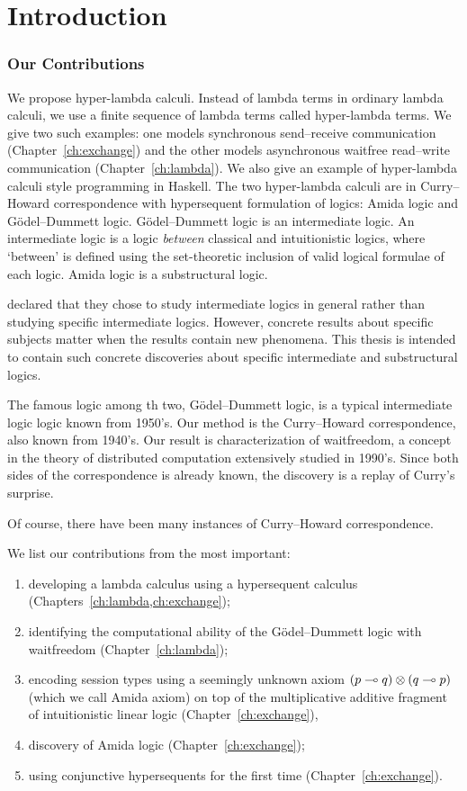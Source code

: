 \chapter{Introduction}

\subsection{Our Contributions}

We propose hyper-lambda calculi.
Instead of lambda terms in ordinary lambda calculi,
we use a finite sequence of lambda terms called hyper-lambda terms.
We give two such examples:
one models synchronous send--receive communication (Chapter~\ref{ch:exchange}) and
the other models asynchronous waitfree
read--write communication (Chapter~\ref{ch:lambda}).
We also give an example of hyper-lambda calculi style programming in Haskell.
The two hyper-lambda calculi are in Curry--Howard correspondence with
hypersequent formulation of logics: Amida logic and G\"odel--Dummett
logic.
G\"odel--Dummett logic is an intermediate logic.
An intermediate logic is a logic \textit{between} classical and
intuitionistic logics, where `between' is defined using the
set-theoretic inclusion of valid logical formulae of each logic.
Amida logic is a substructural logic.

\citet{hosoi-ono} declared that they chose to study intermediate
logics in
general rather than studying specific intermediate logics.
However, concrete results about specific subjects matter when the
results contain new phenomena.
This thesis is intended to contain such concrete discoveries
about specific intermediate and substructural logics.

The famous logic among th two,
G\"odel--Dummett logic, is
a typical intermediate logic logic known from 1950's.
Our method is the Curry--Howard correspondence, also known from 1940's.
Our result is characterization of waitfreedom, a concept in the theory
of distributed computation extensively studied in 1990's.
Since both sides of the correspondence is already known,
the discovery is a replay of Curry's surprise.

Of course, there have been many instances of Curry--Howard correspondence.

We list our contributions from the most important:
\begin{enumerate}
 \item developing a lambda calculus using
       a hypersequent calculus (Chapters~\ref{ch:lambda,ch:exchange});
 \item identifying the computational ability of the
       G\"odel--Dummett logic with waitfreedom (Chapter~\ref{ch:lambda});
 \item encoding session types using a seemingly unknown axiom
       $(p\multimap q)\otimes(q\multimap p)$ (which we call Amida axiom) on top
       of the multiplicative additive fragment of intuitionistic linear
       logic (Chapter~\ref{ch:exchange}),
 \item discovery of Amida logic (Chapter~\ref{ch:exchange});
 \item using conjunctive hypersequents for the first time (Chapter~\ref{ch:exchange}).
\end{enumerate}

